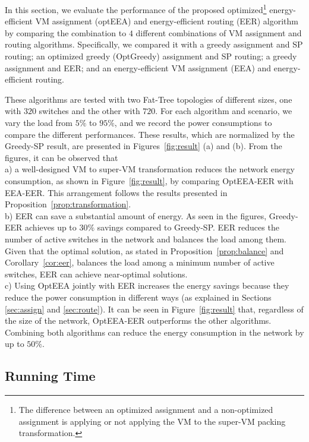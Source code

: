 \documentclass[journal,single-space,two column,twoside,10pt]{IEEEtran}
\begin{document}
In this section, we evaluate the performance of the proposed optimized\footnote{The difference between an optimized assignment and a non-optimized assignment is applying or not applying the VM to the super-VM packing transformation.} energy-efficient VM assignment (optEEA) and energy-efficient routing (EER) algorithm by comparing the combination to $4$ different combinations of VM assignment and routing algorithms. Specifically, we compared it with a greedy assignment and SP routing; an optimized greedy (OptGreedy) assignment and SP routing; a greedy assignment and EER; and an energy-efficient VM assignment (EEA) and energy-efficient routing.

These algorithms are tested with two Fat-Tree topologies of different sizes, one with $320$ switches and the other with $720$. For each algorithm and scenario, we vary the load from $5\%$ to $95\%$, and we record the power consumptions to compare the different performances. These results, which are normalized by the Greedy-SP result, are presented in Figures~\ref{fig:result} (a) and (b). From the figures, it can be observed that \\
a) a well-designed VM to super-VM transformation reduces the network energy consumption, as shown in Figure~\ref{fig:result}, by comparing OptEEA-EER with EEA-EER. This arrangement follows the results presented in Proposition~\ref{prop:transformation}. \\
b) EER can save a substantial amount of energy. As seen in the figures, Greedy-EER achieves up to $30\%$ savings compared to Greedy-SP. EER reduces the number of active switches in the network and balances the load among them. Given that the optimal solution, as stated in Proposition~\ref{prop:balance} and Corollary~\ref{cor:eer}, balances the load among a minimum number of active switches, EER can achieve near-optimal solutions. \\
c) Using OptEEA jointly with EER increases the energy savings because they reduce the power consumption in different ways (as explained in Sections \ref{sec:assign} and \ref{sec:route}). It can be seen in Figure~\ref{fig:result} that, regardless of the size of the network, OptEEA-EER outperforms the other algorithms. Combining both algorithms can reduce the energy consumption in the network by up to $50\%$.


\subsection{Running Time}
\end{document}
